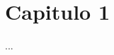 \documentclass[12pt]{book}
\begin{document}
\listoffigures
\listoftables
\chapter{Capitulo 1}
...
\end{document}
